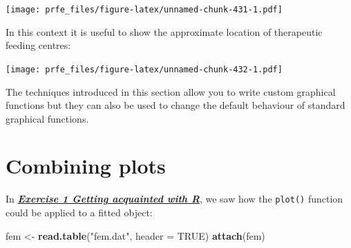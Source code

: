 \documentclass[12pt,a4paper]{book}
\newenvironment{Shaded}{\begin{snugshade}}{\end{snugshade}}
\newcommand{\KeywordTok}[1]{\textcolor[rgb]{0.13,0.29,0.53}{\textbf{#1}}}
\newcommand{\DataTypeTok}[1]{\textcolor[rgb]{0.13,0.29,0.53}{#1}}
\newcommand{\DecValTok}[1]{\textcolor[rgb]{0.00,0.00,0.81}{#1}}
\newcommand{\FloatTok}[1]{\textcolor[rgb]{0.00,0.00,0.81}{#1}}
\newcommand{\StringTok}[1]{\textcolor[rgb]{0.31,0.60,0.02}{#1}}
\newcommand{\OtherTok}[1]{\textcolor[rgb]{0.56,0.35,0.01}{#1}}
\newcommand{\OperatorTok}[1]{\textcolor[rgb]{0.81,0.36,0.00}{\textbf{#1}}}
\newcommand{\NormalTok}[1]{#1}
\theoremstyle{definition}
\theoremstyle{definition}
\theoremstyle{definition}
\theoremstyle{remark}
\begin{document}
\texttt{[image: prfe\_files/figure-latex/unnamed-chunk-431-1.pdf]}

In this context it is useful to show the approximate location of
therapeutic feeding centres:

\begin{Shaded}
\end{Shaded}

\texttt{[image: prfe\_files/figure-latex/unnamed-chunk-432-1.pdf]}

The techniques introduced in this section allow you to write custom
graphical functions but they can also be used to change the default
behaviour of standard graphical functions.

\hypertarget{combining-plots}{%
\section{Combining plots}\label{combining-plots}}

In \protect\hyperlink{exercise1}{\textbf{\emph{Exercise 1 Getting
acquainted with R}}}, we saw how the \texttt{plot()} function could be
applied to a fitted object:

\begin{Shaded}
\begin{Highlighting}[]
\NormalTok{fem <-}\StringTok{ }\KeywordTok{read.table}\NormalTok{(}\StringTok{"fem.dat"}\NormalTok{, }\DataTypeTok{header =} \OtherTok{TRUE}\NormalTok{)}
\KeywordTok{attach}\NormalTok{(fem)}
\end{Highlighting}
\end{Shaded}
\end{document}
